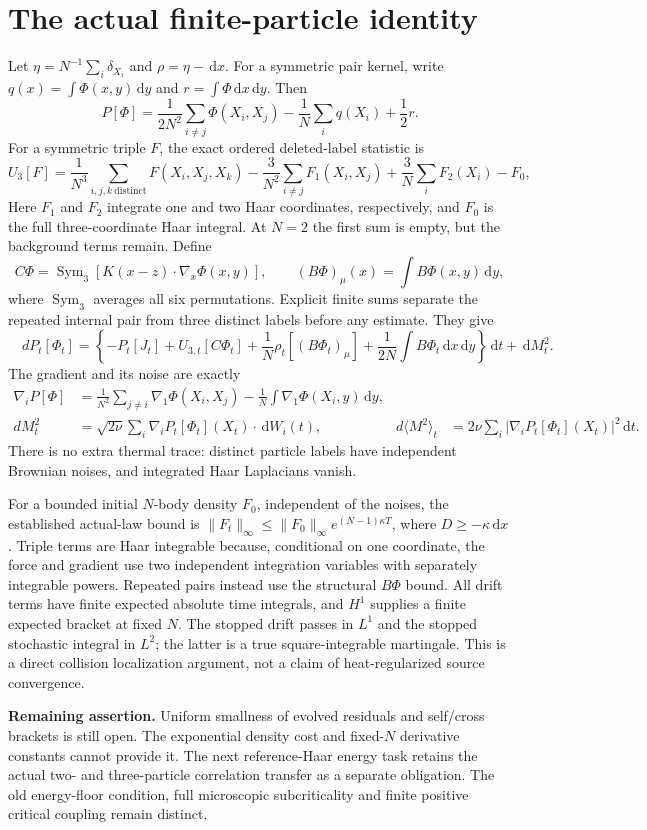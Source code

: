 \documentclass[10pt]{article}
\newcommand{\dd}{\,\mathrm d}
\begin{document}
\section*{The actual finite-particle identity}
Let $\eta=N^{-1}\sum_i\delta_{X_i}$ and $\rho=\eta-\dd x$. For a symmetric pair
kernel, write $q(x)=\int\Phi(x,y)\dd y$ and $r=\int\Phi\dd x\dd y$. Then
\[
 P[\Phi]=\frac1{2N^2}\sum_{i\ne j}\Phi(X_i,X_j)
       -\frac1N\sum_iq(X_i)+\frac12r.
\]
For a symmetric triple $F$, the exact ordered deleted-label statistic is
\[
 U_3[F]=\frac1{N^3}\sum_{i,j,k\ \mathrm{distinct}}F(X_i,X_j,X_k)
 -\frac3{N^2}\sum_{i\ne j}F_1(X_i,X_j)
 +\frac3N\sum_iF_2(X_i)-F_0,
\]
Here $F_1$ and $F_2$ integrate one and two Haar coordinates, respectively,
and $F_0$ is the full three-coordinate Haar integral.
At $N=2$ the first sum is empty, but the background terms remain.
Define
\[
 C\Phi=\operatorname{Sym}_3[K(x-z)\cdot\nabla_x\Phi(x,y)],
 \qquad (B\Phi)_\mu(x)=\int B\Phi(x,y)\dd y,
\]
where $\operatorname{Sym}_3$ averages all six permutations. Explicit finite sums
separate the repeated internal pair from three distinct labels before any
estimate. They give
\[
 \boxed{\quad
 dP_t[\Phi_t]=\left\{-P_t[J_t]+U_{3,t}[C\Phi_t]
 +\frac1N\rho_t[(B\Phi_t)_\mu]
 +\frac1{2N}\int B\Phi_t\dd x\dd y\right\}\dd t+\dd M^2_t.
 \quad}
\]
The gradient and its noise are exactly
\begin{align*}
 \nabla_iP[\Phi]&=\frac1{N^2}\sum_{j\ne i}\nabla_1\Phi(X_i,X_j)
       -\frac1N\int\nabla_1\Phi(X_i,y)\dd y,\\
 dM^2_t&=\sqrt{2\nu}\sum_i\nabla_iP_t[\Phi_t](X_t)\cdot\dd W_i(t),&
 d\langle M^2\rangle_t&=2\nu\sum_i|\nabla_iP_t[\Phi_t](X_t)|^2\dd t.
\end{align*}
There is no extra thermal trace: distinct particle labels have independent
Brownian noises, and integrated Haar Laplacians vanish.

For a bounded initial $N$-body density $F_0$, independent of the noises,
the established actual-law bound is
$\|F_t\|_\infty\le\|F_0\|_\infty e^{(N-1)\kappa T}$,
where $D\ge-\kappa\dd x$. Triple terms are Haar integrable because, conditional
on one coordinate, the force and gradient use two independent integration
variables with separately integrable powers. Repeated pairs instead use the
structural $B\Phi$ bound. All drift terms have finite expected absolute time
integrals, and $H^1$ supplies a finite expected bracket at fixed $N$.
The stopped drift passes in $L^1$ and the stopped stochastic integral in $L^2$;
the latter is a true square-integrable martingale. This is a direct collision
localization argument, not a claim of heat-regularized source convergence.

\noindent\textbf{Remaining assertion.} Uniform smallness of evolved residuals
and self/cross brackets is still open. The exponential density cost and
fixed-$N$ derivative constants cannot provide it. The next reference-Haar
energy task retains the actual two- and three-particle correlation transfer as
a separate obligation. The old energy-floor condition, full microscopic
subcriticality and finite positive critical coupling remain distinct.
\end{document}
